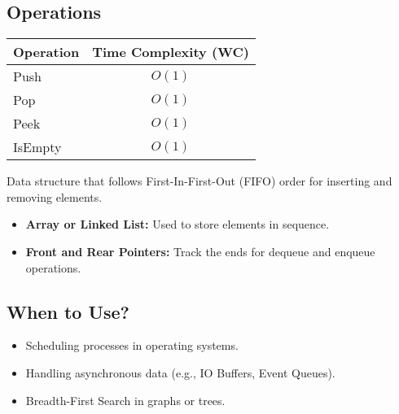 \subsection{Operations}
\begin{summary}
    \begin{center}
        \begin{tabular}{lc}
            \toprule
            \textbf{Operation} & \textbf{Time Complexity (WC)} \\
            \midrule
            Push   & $O(1)$ \\
            Pop    & $O(1)$ \\
            Peek   & $O(1)$ \\
            IsEmpty & $O(1)$ \\
            \bottomrule
        \end{tabular}
    \end{center}
\end{summary}

\begin{summary}
    Data structure that follows First-In-First-Out (FIFO) order for inserting and removing elements.
    \begin{itemize}
        \item \textbf{Array or Linked List:} Used to store elements in sequence.
        \item \textbf{Front and Rear Pointers:} Track the ends for dequeue and enqueue operations.
    \end{itemize}    
\end{summary}

\subsection{When to Use?}
\begin{summary}
    \begin{itemize}
        \item Scheduling processes in operating systems.
        \item Handling asynchronous data (e.g., IO Buffers, Event Queues).
        \item Breadth-First Search in graphs or trees.
    \end{itemize}
\end{summary}

